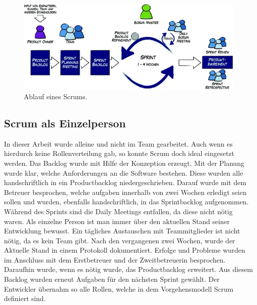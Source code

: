 \begin{figure}[H]
	\centering
	\includegraphics[scale=0.95]{content/pictures/scrum.jpg}
	\caption{Ablauf eines Scrums. \cite{Niermann.2017}}
	\label{fig:scrum}
\end{figure}

\subsection{Scrum als Einzelperson}
In dieser Arbeit wurde alleine und nicht im Team gearbeitet. Auch wenn es hierdurch keine Rollenverteilung gab, so konnte Scrum doch ideal eingesetzt werden. Das Backlog wurde mit Hilfe der Konzeption erzeugt. Mit der Planung wurde klar, welche Anforderungen an die Software bestehen. Diese wurden alle handschriftlich in ein Productbacklog niedergeschrieben. Darauf wurde mit dem Betreuer besprochen, welche aufgaben innerhalb von zwei Wochen erledigt seien sollen und wurden, ebenfalls handschriftlich, in das Sprintbacklog aufgenommen. Während des Sprints sind die Daily Meetings entfallen, da diese nicht nötig waren. Als einzelne Person ist man immer über den aktuellen Stand seiner Entwicklung bewusst. Ein tägliches Austauschen mit Teammitglieder ist nicht nötig, da es kein Team gibt. Nach den vergangenen zwei Wochen, wurde der Aktuelle Stand in einem Protokoll dokumentiert. Erfolge und Probleme wurden im Anschluss mit dem Erstbetreuer und der Zweitbetreuerin besprochen. Daraufhin wurde, wenn es nötig wurde, das Productbacklog erweitert. Aus diesem  Backlog wurden erneut Aufgaben für den nächsten Sprint gewählt. Der Entwickler übernahm so alle Rollen, welche in dem Vorgehensmodell Scrum definiert sind.

